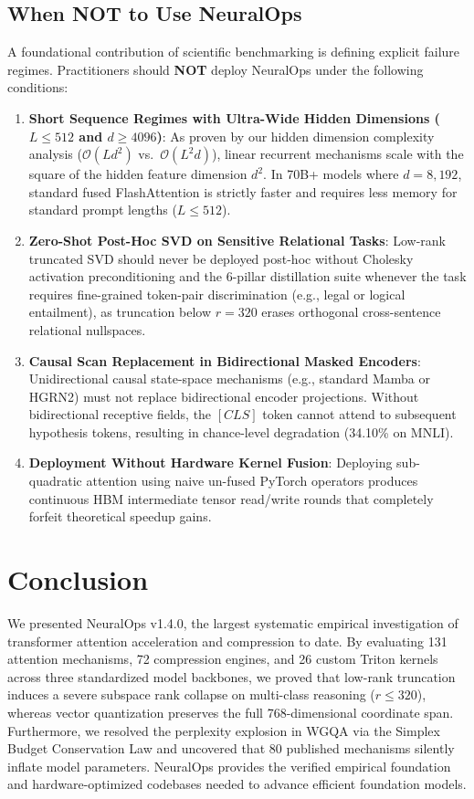 \documentclass{article}
\begin{document}
\subsection{When NOT to Use NeuralOps}
\label{sec:when_not_to_use}
A foundational contribution of scientific benchmarking is defining explicit failure regimes. Practitioners should \textbf{NOT} deploy NeuralOps under the following conditions:
\begin{enumerate}
    \item \textbf{Short Sequence Regimes with Ultra-Wide Hidden Dimensions ($L \le 512$ and $d \ge 4096$)}: As proven by our hidden dimension complexity analysis ($\mathcal{O}(L d^2)$ vs.\ $\mathcal{O}(L^2 d)$), linear recurrent mechanisms scale with the square of the hidden feature dimension $d^2$. In 70B+ models where $d=8,192$, standard fused FlashAttention \citep{dao2022flashattention,dao2023flashattention2} is strictly faster and requires less memory for standard prompt lengths ($L \le 512$).
    \item \textbf{Zero-Shot Post-Hoc SVD on Sensitive Relational Tasks}: Low-rank truncated SVD should never be deployed post-hoc without Cholesky activation preconditioning and the 6-pillar distillation suite whenever the task requires fine-grained token-pair discrimination (e.g., legal or logical entailment), as truncation below $r=320$ erases orthogonal cross-sentence relational nullspaces.
    \item \textbf{Causal Scan Replacement in Bidirectional Masked Encoders}: Unidirectional causal state-space mechanisms (e.g., standard Mamba or HGRN2) must not replace bidirectional encoder projections. Without bidirectional receptive fields, the $[CLS]$ token cannot attend to subsequent hypothesis tokens, resulting in chance-level degradation (34.10\% on MNLI).
    \item \textbf{Deployment Without Hardware Kernel Fusion}: Deploying sub-quadratic attention using naive un-fused PyTorch operators produces continuous HBM intermediate tensor read/write rounds that completely forfeit theoretical speedup gains.
\end{enumerate}

\section{Conclusion}
\label{sec:conclusion}
We presented NeuralOps v1.4.0, the largest systematic empirical investigation of transformer attention acceleration and compression to date. By evaluating 131 attention mechanisms, 72 compression engines, and 26 custom Triton kernels across three standardized model backbones, we proved that low-rank truncation induces a severe subspace rank collapse on multi-class reasoning ($r \le 320$), whereas vector quantization preserves the full 768-dimensional coordinate span. Furthermore, we resolved the perplexity explosion in WGQA via the Simplex Budget Conservation Law and uncovered that 80 published mechanisms silently inflate model parameters. NeuralOps provides the verified empirical foundation and hardware-optimized codebases needed to advance efficient foundation models.
\end{document}

